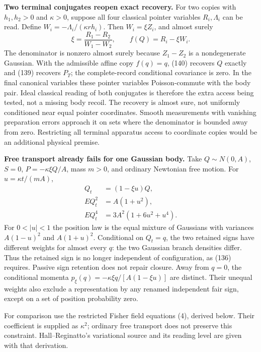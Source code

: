 \documentclass[11pt,a4paper]{article}
\begin{document}
\textbf{Two terminal conjugates reopen exact recovery.} For two copies
with \(h_1,h_2>0\) and \(\kappa>0\), suppose all four classical pointer
variables \(R_i,\Lambda_i\) can be read. Define
\(W_i=-\Lambda_i/(\kappa rh_i)\). Then \(W_i=\xi Z_i\), and almost
surely \[\xi=\frac{R_1-R_2}{W_1-W_2},\qquad
 f(Q)=R_i-\xi W_i.\tag{140}\] The denominator is nonzero almost surely
because \(Z_1-Z_2\) is a nondegenerate Gaussian. With the admissible
affine copy \(f(q)=q\), (140) recovers \(Q\) exactly and (139) recovers
\(P_T\); the complete-record conditional covariance is zero. In the
final canonical variables these pointer variables Poisson-commute with
the body pair. Ideal classical reading of both conjugates is therefore
the extra access being tested, not a missing body recoil. The recovery
is almost sure, not uniformly conditioned near equal pointer
coordinates. Smooth measurements with vanishing preparation errors
approach it on sets where the denominator is bounded away from zero.
Restricting all terminal apparatus access to coordinate copies would be
an additional physical premise.

\textbf{Free transport already fails for one Gaussian body.} Take
\(Q\sim N(0,A)\), \(S=0\), \(P=-\kappa\xi Q/A\), mass \(m>0\), and
ordinary Newtonian free motion. For \(u=\kappa t/(mA)\),
\[\begin{aligned}
Q_t&=(1-\xi u)Q,\\
E Q_t^2&=A(1+u^2),\\
E Q_t^4&=3A^2(1+6u^2+u^4).
\end{aligned}\tag{141}\] For \(0<|u|<1\) the position law is the equal
mixture of Gaussians with variances \(A(1-u)^2\) and \(A(1+u)^2\).
Conditional on \(Q_t=q\), the two retained signs have different weights
for almost every \(q\): the two Gaussian branch densities differ. Thus
the retained sign is no longer independent of configuration, as (136)
requires. Passive sign retention does not repair closure. Away from
\(q=0\), the conditional momenta \(p_\xi(q)=-\kappa\xi q/[A(1-\xi u)]\)
are distinct. Their unequal weights also exclude a representation by any
renamed independent fair sign, except on a set of position probability
zero.

For comparison use the restricted Fisher field equations (4), derived
below. Their coefficient is supplied as \(\kappa^2\); ordinary free
transport does not preserve this constraint. Hall--Reginatto's
variational source and its reading level are given with that derivation.
\end{document}
